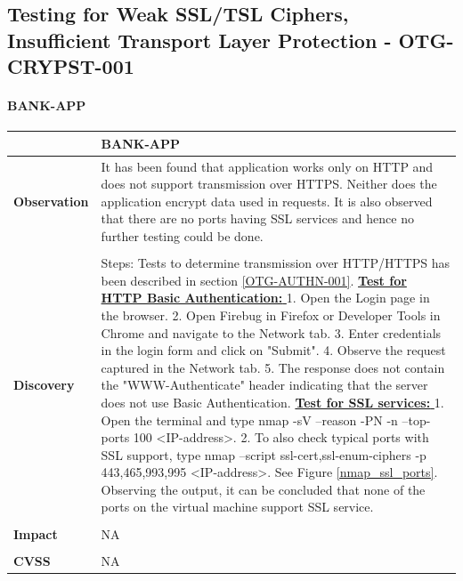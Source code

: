 \subsection{Testing for Weak SSL/TSL Ciphers, Insufficient Transport Layer Protection - OTG-CRYPST-001}
\paragraph{BANK-APP} \mbox{}
\begin{longtable*}{p{.20\textwidth} | p{.80\textwidth}}
	\hline
	& \textbf{BANK-APP} \\
	\hline
	\textbf{Observation} &
	It has been found that application works only on HTTP and does not support transmission over HTTPS. Neither does the application encrypt data used in requests. It is also observed that there are no ports having SSL services and hence no further testing could be done.
	\\\\
	\textbf{Discovery} &
	Steps:
	Tests to determine transmission over HTTP/HTTPS has been described in section \ref{OTG-AUTHN-001}.
	\underline{\textbf{Test for HTTP Basic Authentication: }}
	1. Open the Login page in the browser.
	2. Open Firebug in Firefox or Developer Tools in Chrome and navigate to the Network tab.
	3. Enter credentials in the login form and click on "Submit".
	4. Observe the request captured in the Network tab.
	5. The response does not contain the "WWW-Authenticate" header indicating that the server does not use Basic Authentication.
	\underline{\textbf{Test for SSL services: }}
	1. Open the terminal and type nmap -sV --reason -PN -n --top-ports 100 <IP-address>.
	2. To also check typical ports with SSL support, type nmap --script ssl-cert,ssl-enum-ciphers -p 443,465,993,995 <IP-address>. See Figure \ref{nmap_ssl_ports}.
	Observing the output, it can be concluded that none of the ports on the virtual machine support SSL service.
	\\\\
	\textbf{Impact} &
	NA
	\\\\
	\textbf{CVSS} &
	NA
	\\
	\hline
\end{longtable*}
